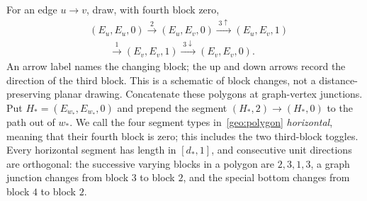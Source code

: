 For an edge $u\to v$, draw, with fourth block zero,
\begin{equation}\label{geo:polygon}
 \begin{aligned}
 &(E_u,E_u,0)\xrightarrow{\;2\;}(E_u,E_v,0)
                 \xrightarrow{\;3\uparrow\;}(E_u,E_v,1)\\
 &\qquad\xrightarrow{\;1\;}(E_v,E_v,1)
                 \xrightarrow{\;3\downarrow\;}(E_v,E_v,0).
 \end{aligned}
\end{equation}
An arrow label names the changing block; the up and down arrows record
the direction of the third block. This is a schematic of block changes,
not a distance-preserving planar drawing.
Concatenate these polygons at graph-vertex junctions. Put
$H_*=(E_{w_*},E_{w_*},0)$ and prepend the segment
$(H_*,2)\longrightarrow(H_*,0)$ to the path out of $w_*$.
We call the four segment types in~\eqref{geo:polygon} \emph{horizontal},
meaning that their fourth block is zero; this includes the two third-block
toggles. Every horizontal segment has length in $[d_*,1]$, and consecutive unit
directions are orthogonal: the successive varying blocks in a polygon
are $2,3,1,3$, a graph junction changes from block $3$ to block $2$,
and the special bottom changes from block $4$ to block $2$.

